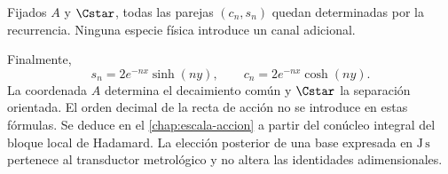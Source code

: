 \begin{corollary}
Fijados \(A\) y \(\Cstar\), todas las parejas \((c_n,s_n)\) quedan
determinadas por la recurrencia. Ninguna especie física introduce un canal
adicional.
\end{corollary}

Finalmente,
\[
 s_n=2e^{-nx}\sinh(ny),
 \qquad
 c_n=2e^{-nx}\cosh(ny).
\]
La coordenada \(A\) determina el decaimiento común y \(\Cstar\) la separación
orientada. El orden decimal de la recta de acción no se introduce en estas
fórmulas. Se deduce en el \cref{chap:escala-accion} a partir del conúcleo
integral del bloque local de Hadamard. La elección posterior de una base
expresada en \(\mathrm{J\,s}\) pertenece al transductor metrológico y no
altera las identidades adimensionales.
